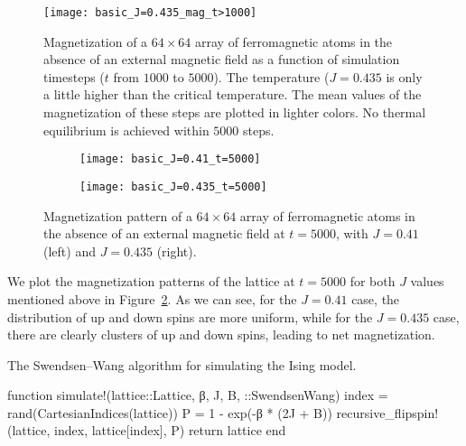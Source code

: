 \begin{figure}[hbt]
    \centering
    \texttt{[image: basic\_J=0.435\_mag\_t>1000]}
    \caption{Magnetization of a \(64 \times 64\) array of ferromagnetic atoms in the absence
        of an external magnetic field as a function of simulation timesteps (\(t\) from
        \(1000\) to \(5000\)). The temperature (\(J = 0.435\) is only a little higher than
        the critical temperature. The mean values of the magnetization of these steps are
        plotted in lighter colors. No thermal equilibrium is achieved within \(5000\)
        steps.}
    \label{fig:mag_J=0.435}
\end{figure}

\begin{figure}[hbt]
    \centering
    \begin{subfigure}{0.49\textwidth}
        \centering
        \texttt{[image: basic\_J=0.41\_t=5000]}
    \end{subfigure}
    \hfill
    \begin{subfigure}{0.49\textwidth}
        \centering
        \texttt{[image: basic\_J=0.435\_t=5000]}
    \end{subfigure}
    \caption{Magnetization pattern of a \(64 \times 64\) array of ferromagnetic atoms in the
        absence of an external magnetic field at \(t = 5000\), with \(J = 0.41\) (left) and
        \(J = 0.435\) (right).}
    \label{fig:t_5000}
\end{figure}

We plot the magnetization patterns of the lattice at \(t = 5000\) for both \(J\) values
mentioned above in Figure~\ref{fig:t_5000}. As we can see, for the \(J = 0.41\) case, the
distribution of up and down spins are more uniform, while for the \(J = 0.435\) case, there
are clearly clusters of up and down spins, leading to net magnetization.

\begin{algorithm}
    \caption{The Swendsen--Wang algorithm for simulating the Ising model.}
    \label{lst:cluster}
    \begin{juliacode}
        function simulate!(lattice::Lattice, β, J, B, ::SwendsenWang)
            index = rand(CartesianIndices(lattice))
            P = 1 - exp(-β * (2J + B))
            recursive_flipspin!(lattice, index, lattice[index], P)
            return lattice
        end
    \end{juliacode}
\end{algorithm}


